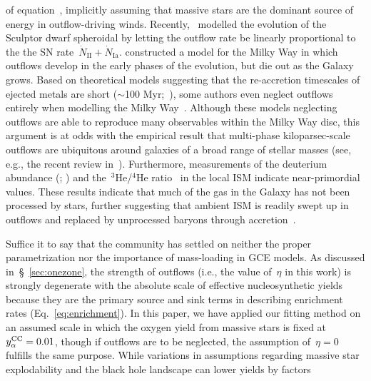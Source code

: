 \documentclass[foo.tex]{subfiles}
\begin{document}
of equation~, implicitly assuming that massive stars are
the dominant source of energy in outflow-driving winds.
Recently,~\citet{delosReyes2022} modelled the evolution of the Sculptor dwarf
spheroidal by letting the outflow rate be linearly proportional to the the
SN rate~$\dot{N}_\text{II} + \dot{N}_\text{Ia}$.
\citet*{Kobayashi2020} constructed a model for the Milky Way in which
outflows develop in the early phases of the evolution, but die out as the
Galaxy grows.
Based on theoretical models suggesting that the re-accretion timescales of
ejected metals are short ($\sim$100 Myr;~\citealp{Melioli2008, Melioli2009,
Spitoni2008, Spitoni2009}), some authors even neglect outflows entirely when
modelling the Milky Way~\citep[e.g.,][]{Minchev2013, Minchev2014, Minchev2017,
Spitoni2019, Spitoni2021}.
Although these models neglecting outflows are able to reproduce many
observables within the Milky Way disc, this argument is at odds with the
empirical result that multi-phase kiloparsec-scale outflows are ubiquitous
around galaxies of a broad range of stellar masses (see, e.g., the recent
review in~\citealt{Veilleux2020}).
Furthermore, measurements of the deuterium abundance (\citealp{Linsky2006};
\citealp*{Prodanovic2010}) and the~$^3$He/$^4$He ratio~\citep{Balser2018} in
the local ISM indicate near-primordial values.
These results indicate that much of the gas in the Galaxy has not been
processed by stars, further suggesting that ambient ISM is readily swept up in
outflows and replaced by unprocessed baryons through
accretion~\citep{Weinberg2017b, Cooke2022}.
\par
Suffice it to say that the community has settled on neither the proper
parametrization nor the importance of mass-loading in GCE models.
As discussed in~\S~\ref{sec:onezone}, the strength of outflows (i.e., the value
of~$\eta$ in this work) is strongly degenerate with the absolute scale of
effective nucleosynthetic yields because they are the primary source and sink
terms in describing enrichment rates (Eq.~\ref{eq:enrichment}).
In this paper, we have applied our fitting method on an assumed scale in which
the oxygen yield from massive stars is fixed at~$y_\alpha^\text{CC} = 0.01$, though if
outflows are to be neglected, the assumption of~$\eta = 0$ fulfills the same
purpose.
While variations in assumptions regarding massive star explodability and the
black hole landscape can lower yields by factors
\end{document}
